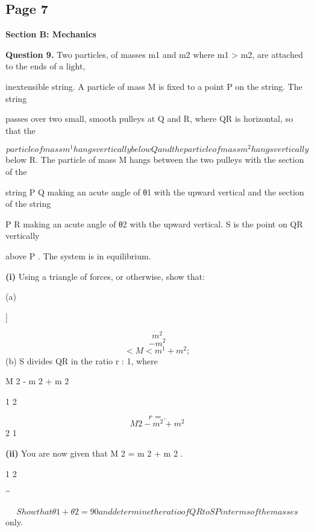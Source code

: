 \documentclass[12pt]{article}
\begin{document}
\subsection*{Page 7}
\begin{flushleft}
\bigskip\textbf{Section B: Mechanics}\par
\bigskip\textbf{Question 9.} Two particles, of masses m1 and m2 where m1 > m2, are attached to the ends of a light,\par
inextensible string. A particle of mass M is fixed to a point P on the string. The string\par
passes over two small, smooth pulleys at Q and R, where QR is horizontal, so that the\par
\[particle of mass m^1 hangs vertically below Q and the particle of mass m^2 hangs vertically\]
below R. The particle of mass M hangs between the two pulleys with the section of the\par
string P Q making an acute angle of θ1 with the upward vertical and the section of the string\par
P R making an acute angle of θ2 with the upward vertical. S is the point on QR vertically\par
above P . The system is in equilibrium.\par
\textbf{(i)} Using a triangle of forces, or otherwise, show that:\par
(a)\par
]\par
\[m^2\]
\[- m^2\]
\[< M < m^1 + m^2 ;\]
(b) S divides QR in the ratio r : 1, where\par
M 2 - m 2 + m 2\par
1 2\par
\[r = .\]
\[M 2 - m^2 + m^2\]
2 1\par
\textbf{(ii)} You are now given that M 2 = m 2 + m 2 .\par
1 2\par
\textasciicircum{}\circ\par
\[Show that θ1 + θ2 = 90 and determine the ratio of QR to SP in terms of the masses\]
only.\par
\end{flushleft}
\end{document}
